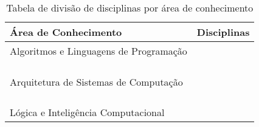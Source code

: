 \begin{table}[ht]
	\centering
	\caption{Tabela de divisão de disciplinas por área de conhecimento}
	\label{tab:areas}
	\begin{tabularx}{\textwidth}{ X  l }
		\hiderowcolors
		\hline
		{\bf Área de Conhecimento}                              & {\bf Disciplinas} \\
		\hline
		\multirow{5}{*}{Algoritmos e Linguagens de Programação} & \AlgComp          \\
																& \AnAlg            \\
		                                                        & \EstrInf          \\
		                                                        & \LabProgA         \\
		                                                        & \LabProgB         \\
		                                                        & \TeoComp          \\ 
																& \Grafos			\\ \hline
		\multirow{8}{*}{Arquitetura de Sistemas de Computação}  & \ArqComp          \\ %
																& \CompParal        \\ %
		                                                        & \Control          \\ %
		                                                        & \FundIComp         \\ %
																& \FundComp         \\ %
																& \Instala			\\ %
		                                                        & \ProjSO           \\ %
																& \Telep            \\ %
		                                                        & \Sredes         	\\ %
		                                                        & \SistEmb          \\ %
		                                                        \hline	
		\multirow{3}{*}{Lógica e Inteligência Computacional}    & \IC               \\ %

\end{tabularx}
\end{table}

